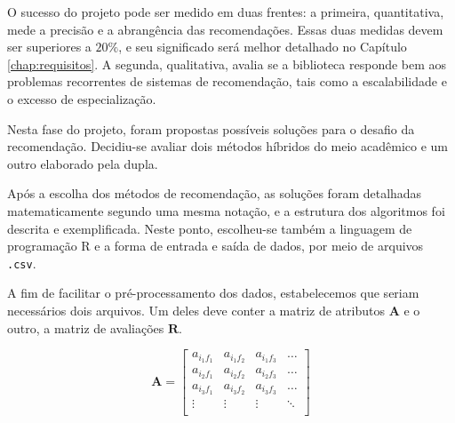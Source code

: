

O sucesso do projeto pode ser medido em duas frentes: a primeira, quantitativa, mede a precisão e a abrangência das recomendações. Essas duas medidas devem ser superiores a $20\%$, e seu significado será melhor detalhado no Capítulo \ref{chap:requisitos}.  A segunda, qualitativa, avalia se a biblioteca responde bem aos problemas recorrentes de sistemas de recomendação, tais como a escalabilidade e o excesso de especialização.  



Nesta fase do projeto, foram propostas possíveis soluções para o desafio da recomendação. Decidiu-se avaliar dois métodos híbridos do meio acadêmico e um outro elaborado pela dupla. 



Após a escolha dos métodos de recomendação, as soluções foram detalhadas matematicamente segundo uma mesma notação, e a estrutura dos algoritmos foi descrita e exemplificada. Neste ponto, escolheu-se também a linguagem de programação R e a forma de entrada e saída de dados, por meio de arquivos \texttt{.csv}.

A fim de facilitar o pré-processamento dos dados, estabelecemos que seriam necessários dois arquivos. Um deles deve conter a matriz de atributos $\mathbf{A}$ e o outro, a matriz de avaliações  $\mathbf{R}$. 

\begin{equation} 
\mathbf{A} = 
\begin{bmatrix} 
 a_{i_1 f_1} &  a_{i_1 f_2} &  a_{i_1 f_3}  & \dots   \\
 a_{i_2 f_1} &  a_{i_2 f_2} &  a_{i_2 f_3}  & \dots   \\
 a_{i_3 f_1} &  a_{i_3 f_2} &  a_{i_3 f_3}  & \dots  \\ 
 \vdots &  \vdots &  \vdots  & \ddots   \\
 \end{bmatrix}
\end{equation}


